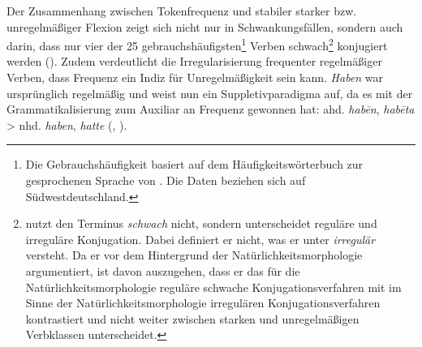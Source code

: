  
Der Zusammenhang zwischen Tokenfrequenz und stabiler starker bzw. unregelmäßiger Flexion zeigt sich nicht nur in Schwankungsfällen, sondern auch darin, dass nur vier der 25 gebrauchshäufigsten\footnote{Die Gebrauchshäufigkeit basiert auf dem Häufigkeitswörterbuch zur gesprochenen Sprache von \textcite{Ruoff.1981}. Die Daten beziehen sich auf Südwestdeutschland.} Verben schwach\footnote{\textcite{Harnisch.1988} nutzt den Terminus \textit{schwach} nicht, sondern unterscheidet reguläre und irreguläre Konjugation. Dabei definiert er nicht, was er unter \textit{irregulär} versteht. Da er vor dem Hintergrund der Natürlichkeitsmorphologie argumentiert, ist davon auszugehen, dass er das für die Natürlichkeitsmorphologie reguläre schwache Konjugationsverfahren mit im Sinne der Natürlichkeitsmorphologie irregulären Konjugationsverfahren kontrastiert und nicht weiter zwischen starken und unregelmäßigen Verbklassen unterscheidet.} konjugiert werden (\cite[430]{Harnisch.1988}). Zudem verdeutlicht die Irregularisierung frequenter regelmäßiger Verben, dass Frequenz ein Indiz für Unregelmäßigkeit sein kann. \textit{Haben} war ursprünglich regelmäßig und weist nun ein Suppletivparadigma auf, da es mit der Grammatikalisierung zum Auxiliar an Frequenz gewonnen hat: ahd. \textit{hab\={e}n}, \textit{hab\={e}ta} > nhd. \textit{haben}, \textit{hatte} (\cite[17--18]{Nubling.2000}, \cite[174]{Nowak.2013}). 

